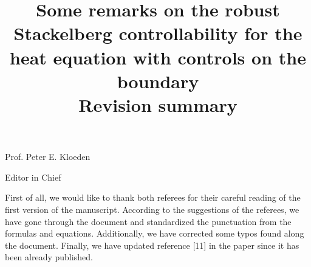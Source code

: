 \documentclass[final,10pt]{article}
\numberwithin{equation}{section}
\numberwithin{theorem}{section}
\begin{document}
\title{{\bf Some remarks on the robust Stackelberg controllability for the heat equation with controls on the boundary}\\
Revision summary}


\maketitle

Prof. Peter E. Kloeden

Editor in Chief

\vspace{0.5 cm}

First of all, we would like to thank both referees for their careful reading of the first version of the manuscript. According to the suggestions of the referees, we have gone through the document and standardized the punctuation from the formulas and equations. Additionally, we have corrected some typos found along the document. Finally, we have updated reference [11] in the paper since it has been already published. 


\end{document}
